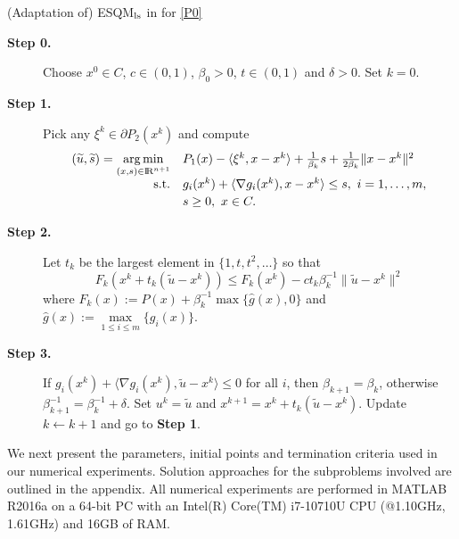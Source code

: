 \documentclass[10pt]{article}
\numberwithin{equation}{section}
\def\R{{\rm I\!R}}
\def\argmin{\mathop{\rm arg\,min}}
\begin{document}
\begin{algorithm}
\caption{(Adaptation of) ESQM$_{\rm ls}$ in \cite{Au13} for \eqref{P0}}\label{ESQM}
\begin{algorithmic}
\STATE
\begin{description}
  \item[\bf Step 0.] Choose $x^0\in C$, $c \in (0, 1)$, $\beta_0 > 0$, $t\in(0, 1)$ and $\delta > 0$. Set $k = 0$.
  \item[\bf Step 1.] Pick any $\xi^k\in\partial P_2(x^k)$ and compute
  \begin{equation}\label{subproblemhaha}
  \begin{array}{rl}
  (\widetilde u,\widetilde s) = \argmin\limits_{(x,s)\in\R^{n+1}} & P_1(x) -\langle \xi^k, x - x^k\rangle + \frac{1}{\beta_k} s + \frac{1}{2\beta_k}\|x - x^k\|^2\\ [2pt]
      {\rm s.t.}& g_i(x^k) + \langle \nabla g_i(x^k), x - x^k\rangle \leq s,\ i = 1, \ldots, m,\\ [2pt]
      & s \geq 0,\ x\in C.
  \end{array}
  \end{equation}

  \item[\bf Step 2.] Let $t_k$ be the largest element in $\{1, t, t^2, \ldots\}$ so that
  \begin{equation*}
    F_k(x^k + t_k (\widetilde{u} - x^k)) \le F_k(x^k) - c t_k \beta_k^{-1} \|\widetilde{u} - x^k\|^2
  \end{equation*}
  where $F_k(x):= P(x) + \beta^{-1}_k \max\{\widehat g(x),0\}$ and $\widehat g(x) := \max\limits_{1\le i\le m}\{g_i(x)\}$.

  \item[\bf Step 3.] If $g_i(x^k) + \langle \nabla g_i(x^k), \widetilde{u} - x^k\rangle \leq 0$ for all $i$, then $\beta_{k+1} = \beta_k$, otherwise $\beta_{k+1}^{-1} = \beta_k^{-1} + \delta$. Set $u^k = \widetilde u$ and $x^{k+1} = x^k + t_k (\widetilde{u} - x^k)$. Update $k \leftarrow k+1$ and go to \textbf{Step 1}.
\end{description}
\end{algorithmic}
\end{algorithm}

We next present the parameters, initial points and termination criteria used in our numerical experiments. Solution approaches for the subproblems involved are outlined in the appendix. All numerical experiments are performed in {\color{black} MATLAB R2016a on a 64-bit PC with an Intel(R) Core(TM) i7-10710U CPU (@1.10GHz, 1.61GHz) and 16GB of RAM.}
\end{document}
